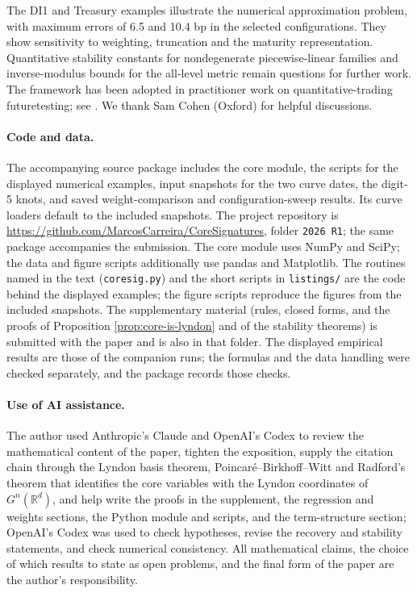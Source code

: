 \documentclass[11pt,english]{article}
\theoremstyle{definition}
\theoremstyle{remark}
\begin{document}
The DI1 and Treasury examples illustrate the numerical approximation
problem, with maximum errors of 6.5 and 10.4 bp in the selected
configurations. They show sensitivity to weighting, truncation and
the maturity representation. Quantitative stability constants
for nondegenerate piecewise-linear families and inverse-modulus
bounds for the all-level metric remain questions for further work.
The framework has been adopted in practitioner work on
quantitative-trading futuretesting; see \cite{bloch_futuretesting}.
We thank Sam Cohen (Oxford) for helpful discussions.


\paragraph{Code and data.}
The accompanying source package includes the core module, the
scripts for the displayed numerical examples, input snapshots for
the two curve dates, the digit-5 knots, and saved weight-comparison
and configuration-sweep results. Its curve loaders default to the
included snapshots. The project repository is
\url{https://github.com/MarcosCarreira/CoreSignatures}, folder
\texttt{2026 R1}; the same package accompanies the submission. The core
module uses NumPy and SciPy; the data and figure scripts additionally
use pandas and Matplotlib. The routines named in the text
(\texttt{coresig.py}) and the short scripts in \texttt{listings/} are
the code behind the displayed examples; the figure scripts reproduce
the figures from the included snapshots. The supplementary material
(rules, closed forms, and the proofs of Proposition
\ref{prop:core-is-lyndon} and of the stability theorems) is submitted
with the paper and is also in that folder.
The displayed empirical results are those of the companion runs; the
formulas and the data handling were checked separately, and the
package records those checks.

\paragraph{Use of AI assistance.}
The author used Anthropic's Claude and OpenAI's Codex to review the mathematical content
of the paper, tighten the exposition, supply the citation chain through
the Lyndon basis theorem, Poincaré--Birkhoff--Witt and Radford's theorem
that identifies the core variables with the Lyndon coordinates of
$G^{n}(\mathbb{R}^{d})$, and help write the proofs in the supplement,
the regression and weights sections, the Python module and scripts, and
the term-structure section; OpenAI's Codex was used to check
hypotheses, revise the recovery and stability statements, and check
numerical consistency. All mathematical claims, the choice of which
results to state as open problems, and the final form of the paper are
the author's responsibility.
\end{document}
